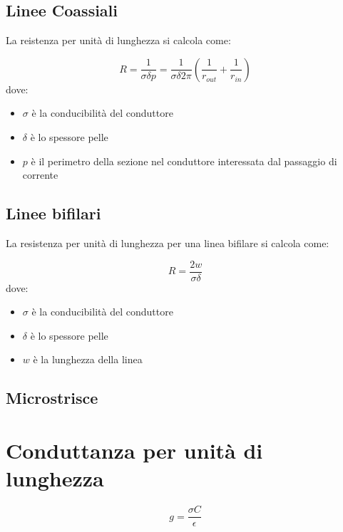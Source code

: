 \documentclass[10pt,a4paper]{report}
\begin{document}
		\subsection{Linee Coassiali}

			La reistenza per unità di lunghezza si calcola come:

			\begin{equation}R=\frac{1}{\sigma \delta p}=\frac{1}{\sigma \delta 2 \pi}(\frac{1}{r_{out}}+\frac{1}{r_{in}})\end{equation}
			dove:
			
			\begin{itemize}
			\item $\sigma$ è la conducibilità del conduttore
			\item $\delta$ è lo spessore pelle
			\item $p$ è il perimetro della sezione nel conduttore interessata dal passaggio di corrente
			\end{itemize}

		\subsection{Linee bifilari}

				La resistenza per unità di lunghezza per una linea bifilare si calcola come:

				\begin{equation}R=\frac{2w}{\sigma \delta}\end{equation}
				dove:
				
				\begin{itemize}
				\item $\sigma$ è la conducibilità del conduttore
				\item $\delta$ è lo spessore pelle
				\item $w$ è la lunghezza della linea
				\end{itemize}

		\subsection{Microstrisce}


		\section{Conduttanza per unità di lunghezza}

			\begin{equation}
			g=\frac{\sigma C}{\epsilon}
			\end{equation}
\end{document}

